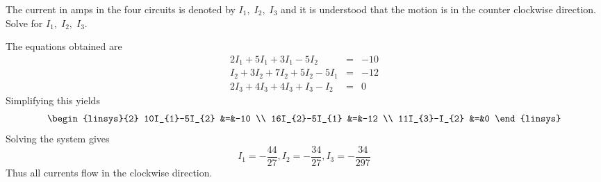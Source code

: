 \begin{Exercise}[
name={},
title={}, 
difficulty=0,
origin={\cite{KK}}]
The current in
amps in the four circuits is denoted by $I_{1},\;I_{2},\;I_{3}$ and it is
understood that the motion is in the counter clockwise direction.  Solve for $I_{1},\;I_{2},\;I_{3}$.
\end{Exercise}

\begin{Answer}
The equations obtained are
\begin{eqnarray*}
2I_{1}+5I_{1}+3I_{1}-5I_{2} &=&-10 \\
I_{2}+3I_{2}+7I_{2}+5I_{2}-5I_{1} &=&-12 \\
2I_{3}+4I_{3}+4I_{3}+I_{3}-I_{2} &=&0
\end{eqnarray*}
Simplifying this yields
\begin{eqnarray*}
\begin{linsys}{2}
10I_{1}-5I_{2} &=&-10 \\
16I_{2}-5I_{1} &=&-12 \\
11I_{3}-I_{2} &=&0
\end{linsys}
\end{eqnarray*}
Solving the system gives
\[
I_{1}=-
\frac{44}{27},I_{2}=-\frac{34}{27},I_{3}=-\frac{34}{297}
\]
Thus all currents flow in the clockwise direction.
\end{Answer}
